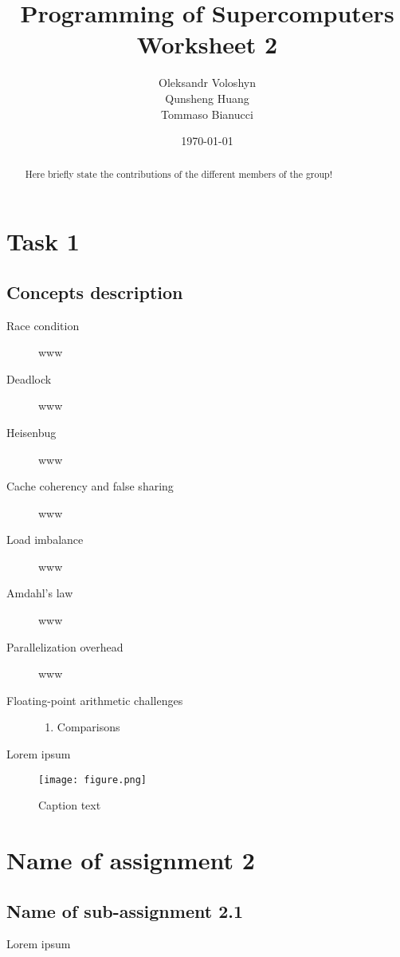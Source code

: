 \documentclass{article}
\title{Programming of Supercomputers\\Worksheet 2}
\author{Oleksandr Voloshyn\\ Qunsheng Huang\\ Tommaso Bianucci}
\date{\today}
\begin{document}
\maketitle
\renewcommand{\abstractname}{Group members's contributions}
\begin{abstract}
	Here briefly state the contributions of the different members of the group!
\end{abstract}

\section{Task 1}
\subsection{Concepts description}
\begin{description}
	\item[Race condition] www
	\item[Deadlock] www
	\item[Heisenbug] www
	\item[Cache coherency and false sharing] www
	\item[Load imbalance] www
	\item[Amdahl's law] www
	\item[Parallelization overhead] www
	\item[Floating-point arithmetic challenges]
		\begin{enumerate}[label=\Alph*]
			\item Comparisons
		\end{enumerate}
\end{description}
Lorem ipsum

\begin{figure}[h!] %
 	\begin{center}
 		\texttt{[image: figure.png]} %
 		\caption{Caption text}
 		\label{fig:figureLabelName}
 	\end{center}
\end{figure}

\section{Name of assignment 2}
\subsection{Name of sub-assignment 2.1}
Lorem ipsum
\end{document}
